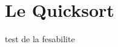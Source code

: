 \documentclass[French,Hoar.tex]{subfiles}
\begin{document}
  \section{Le Quicksort}
  test de la fesabilite
\end{document}
